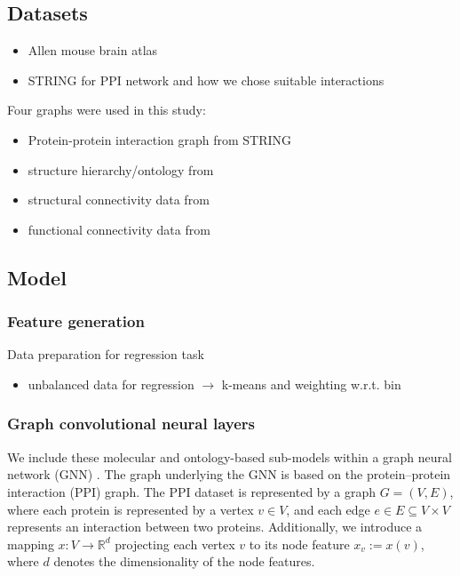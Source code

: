 \documentclass[]{article}
\renewcommand{\cite}{\citep}
\begin{document}
\subsection{Datasets}
\begin{itemize}
	\item Allen mouse brain atlas \cite{MouseBrainAtlas}
	\item STRING for PPI network and how we chose suitable interactions \cite{STRINGv10}
\end{itemize}

Four graphs were used in this study:
\begin{itemize}
	\item Protein-protein interaction graph from STRING
	\item structure hierarchy/ontology from \cite{MouseBrainAtlas}
	\item structural connectivity data from \cite{AIDAmri2019}
	\item functional connectivity data from \cite{AIDAmri2019}
\end{itemize}

\subsection{Model}

\subsubsection{Feature generation}

Data preparation for regression task
\begin{itemize}
	\item unbalanced data for regression $\rightarrow$ k-means and weighting w.r.t. bin
	
\end{itemize}

\subsubsection{Graph convolutional neural layers}

We include these molecular and ontology-based sub-models within a
graph neural network (GNN) \cite{GCNConv}. The graph underlying the GNN is
based on the protein--protein interaction (PPI) graph. The PPI dataset
is represented by a graph $G=(V,E)$, where each protein is represented
by a vertex $v\in V$, and each edge $e\in E\subseteq V\times V$
represents an interaction between two proteins. Additionally, we
introduce a mapping $x:V\rightarrow\mathbb{R}^{d}$ projecting each
vertex $v$ to its node feature $x_v := x(v)$, where $d$ denotes the
dimensionality of the node features.
\end{document}
